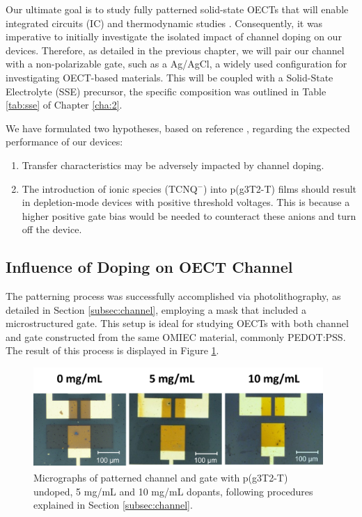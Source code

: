 Our ultimate goal is to study fully patterned solid-state OECTs that will enable integrated circuits (IC) and thermodynamic studies \cite{cucchiThermodynamicsOrganicElectrochemical2022}. Consequently, it was imperative to initially investigate the isolated impact of channel doping on our devices. Therefore, as detailed in the previous chapter, we will pair our channel with a non-polarizable gate, such as a Ag/AgCl, a widely used configuration for investigating OECT-based materials. This will be coupled with a Solid-State Electrolyte (SSE) precursor, the specific composition was outlined in Table \ref{tab:sse} of Chapter \ref{cha:2}.

We have formulated two hypotheses, based on reference \cite{tanTuningOrganicElectrochemical2022}, regarding the expected performance of our devices:

\begin{enumerate}
\item Transfer characteristics may be adversely impacted by channel doping.

\item The introduction of ionic species (TCNQ$^{-}$) into p(g3T2-T) films should result in depletion-mode devices with positive threshold voltages. This is because a higher positive gate bias would be needed to counteract these anions and turn off the device.
\end{enumerate}


\subsection{Influence of Doping on OECT Channel}
The patterning process was successfully accomplished via photolithography, as detailed in Section \ref{subsec:channel}, employing a mask that included a microstructured gate. This setup is ideal for studying OECTs with both channel and gate constructed from the same OMIEC material, commonly PEDOT:PSS. The result of this process is displayed in Figure \ref{fig:channel}. 

\begin{figure}[ht]
  \centering
  \includegraphics[width=11cm]{Images/pdf/BigGateDevices.pdf}
  \caption[Micrographs of a patterned channel and gate p(g3T2-T) at different doping levels]{Micrographs of patterned channel and gate with p(g3T2-T) undoped, 5 mg/mL and 10 mg/mL dopants, following procedures explained in Section \ref{subsec:channel}.}
  \label{fig:channel}
\end{figure}

